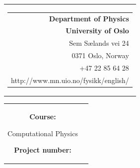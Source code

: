 


% 
{}
\thispagestyle{empty}
\begin{nopagebreak}
{\samepage 
\begin{tabular}{r}
\parbox{\textwidth}{  
\hfill \parbox{5.5cm}{\begin{tabular}{r} %
{\small \textbf{Department of Physics}}\\
{\small  \textbf{University of Oslo}} \\
{\small  Sem S\ae lands vei 24} \\
{\small  0371 Oslo, Norway} \\
{\small +47 22 85 64 28} \\
{\small http://www.mn.uio.no/fysikk/english/}
\end{tabular}}}

\end{tabular}

\vspace{2.5cm}
\begin{tabular}{cc}
\parbox{8cm}{
\begin{description}
\item { \textbf{Course:}}

	Computational Physics\\
	\hspace{4cm}
	\vspace{0.7cm}
\item { \textbf{Project number:}}


\end{description}}
\end{tabular}}
\end{nopagebreak}
